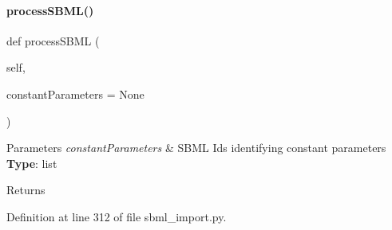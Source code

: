 \paragraph{\texorpdfstring{process\+S\+B\+M\+L()}{processSBML()}}
{\footnotesize\ttfamily def process\+S\+B\+ML (\begin{DoxyParamCaption}\item[{}]{self,  }\item[{}]{constant\+Parameters = {\ttfamily None} }\end{DoxyParamCaption})}


\begin{DoxyParams}{Parameters}
{\em constant\+Parameters} & S\+B\+ML Ids identifying constant parameters ~\newline
{\bfseries Type}\+: list\\
\hline
\end{DoxyParams}
\begin{DoxyReturn}{Returns}

\end{DoxyReturn}


Definition at line 312 of file sbml\+\_\+import.\+py.

